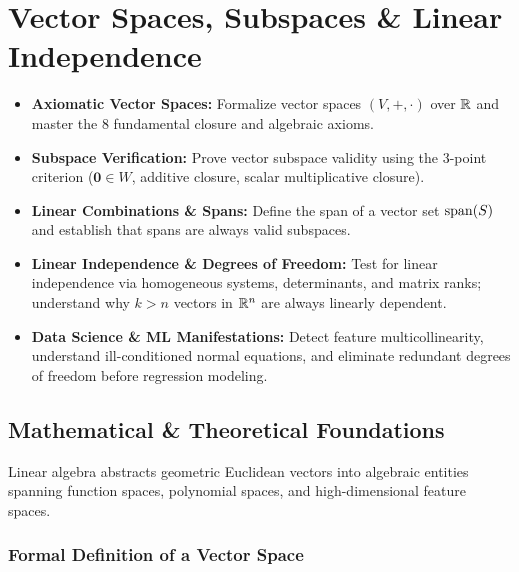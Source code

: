 \chapter{Vector Spaces, Subspaces \& Linear Independence}

\begin{tcolorbox}[colback=primarylight, colframe=primarydark, title={\textbf{Executive Roadmap \& Learning Objectives}}]
\begin{itemize}
    \item \textbf{Axiomatic Vector Spaces:} Formalize vector spaces $(V, +, \cdot)$ over $\mathbb{R}$ and master the 8 fundamental closure and algebraic axioms.
    \item \textbf{Subspace Verification:} Prove vector subspace validity using the 3-point criterion ($\mathbf{0} \in W$, additive closure, scalar multiplicative closure).
    \item \textbf{Linear Combinations \& Spans:} Define the span of a vector set $\operatorname{span}(S)$ and establish that spans are always valid subspaces.
    \item \textbf{Linear Independence \& Degrees of Freedom:} Test for linear independence via homogeneous systems, determinants, and matrix ranks; understand why $k > n$ vectors in $\mathbb{R}^n$ are always linearly dependent.
    \item \textbf{Data Science \& ML Manifestations:} Detect feature multicollinearity, understand ill-conditioned normal equations, and eliminate redundant degrees of freedom before regression modeling.
\end{itemize}
\end{tcolorbox}

\section{Mathematical \& Theoretical Foundations}

Linear algebra abstracts geometric Euclidean vectors into algebraic entities spanning function spaces, polynomial spaces, and high-dimensional feature spaces.

\subsection{Formal Definition of a Vector Space}

